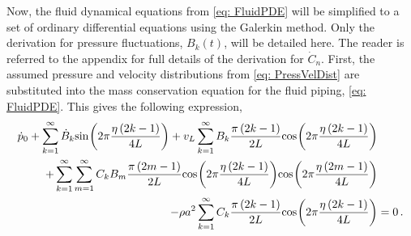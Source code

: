 Now, the fluid dynamical equations from \cref{eq: FluidPDE} will be simplified to a set of ordinary differential equations using the Galerkin method. Only the derivation for pressure fluctuations, $B_k(t)$, will be detailed here. The reader is referred to the appendix for full details of the derivation for $\dot{C}_n$. First, the assumed pressure and velocity distributions from \cref{eq: PressVelDist} are substituted into the mass conservation equation for the fluid piping, \cref{eq: FluidPDE}. This gives the following expression,
~
\begin{equation*}
\begin{split}
    \dot{p}_0
    + \sum_{k=1}^{\infty} \dot{B}_k \fun{sin}{2\pi \frac{\eta \left( 2 k - 1 \right)}{4L}}
    + v_L \sum_{k=1}^{\infty} B_k \frac{\pi \left( 2 k - 1 \right)}{2L} \fun{cos}{2\pi \frac{\eta \left( 2 k - 1 \right)}{4L}} 
    & \\ %
    + \sum_{k=1}^{\infty} \sum_{m=1}^{\infty} C_k B_m \frac{\pi \left( 2 m - 1 \right)}{2L} \fun{cos}{2\pi \frac{\eta \left( 2 k - 1 \right)}{4L}} \fun{cos}{2\pi \frac{\eta \left( 2 m - 1 \right)}{4L}} 
    & \\ %
    - \rho a^2 \sum_{k=1}^{\infty} C_k \frac{\pi \left( 2 k - 1 \right)}{2L} \fun{cos}{2\pi \frac{\eta \left( 2 k - 1 \right)}{4L}}
    &= 0 \, .
\end{split}
\end{equation*}


